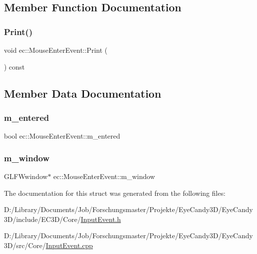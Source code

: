 \subsection{Member Function Documentation}
\mbox{\label{structec_1_1_mouse_enter_event_a341f8c9ee2ee87e4f8c74af90c2fe29d}} 
\subsubsection{\texorpdfstring{Print()}{Print()}}
{\footnotesize\ttfamily void ec\+::\+Mouse\+Enter\+Event\+::\+Print (\begin{DoxyParamCaption}{ }\end{DoxyParamCaption}) const}



\subsection{Member Data Documentation}
\mbox{\label{structec_1_1_mouse_enter_event_ae778f98aa805ff1ce3ba6872177e3fd1}} 
\subsubsection{\texorpdfstring{m\+\_\+entered}{m\_entered}}
{\footnotesize\ttfamily bool ec\+::\+Mouse\+Enter\+Event\+::m\+\_\+entered}

\mbox{\label{structec_1_1_mouse_enter_event_affdb33db16df7493f83e19cd70cfea3c}} 
\subsubsection{\texorpdfstring{m\+\_\+window}{m\_window}}
{\footnotesize\ttfamily G\+L\+F\+Wwindow$\ast$ ec\+::\+Mouse\+Enter\+Event\+::m\+\_\+window}



The documentation for this struct was generated from the following files\+:\begin{DoxyCompactItemize}
\item 
D\+:/\+Library/\+Documents/\+Job/\+Forschungsmaster/\+Projekte/\+Eye\+Candy3\+D/\+Eye\+Candy3\+D/include/\+E\+C3\+D/\+Core/\mbox{\hyperlink{_input_event_8h}{Input\+Event.\+h}}\item 
D\+:/\+Library/\+Documents/\+Job/\+Forschungsmaster/\+Projekte/\+Eye\+Candy3\+D/\+Eye\+Candy3\+D/src/\+Core/\mbox{\hyperlink{_input_event_8cpp}{Input\+Event.\+cpp}}\end{DoxyCompactItemize}
